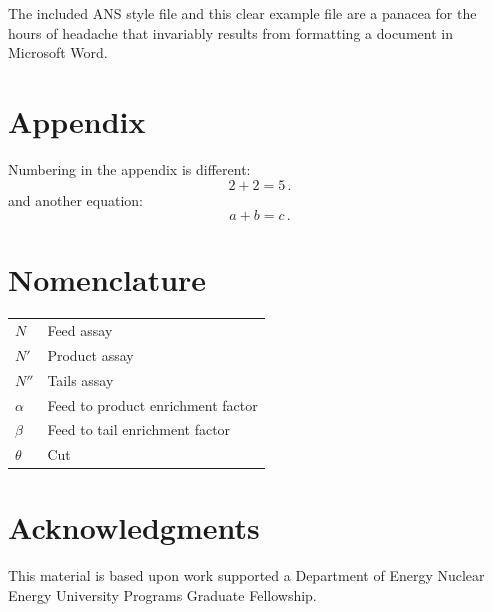 \documentclass{anstrans}
\begin{document}
The included ANS style file and this clear example file are a panacea for
the hours of headache that invariably results from formatting a document in
Microsoft Word.

\appendix
\section{Appendix}

Numbering in the appendix is different:
\begin{equation} \label{eq:appendix}
  2 + 2 = 5\,.
\end{equation}
and another equation:
\begin{equation} \label{eq:appendix2}
  a + b = c\,.
\end{equation}

\section{Nomenclature}

\begin{table}[H]
    \centering
    \begin{tabular}{l|l}
        $N$ & Feed assay \\
        $N'$ & Product assay \\
        $N''$ & Tails assay \\
        $\alpha$ & Feed to product enrichment factor \\
        $\beta$ & Feed to tail enrichment factor \\
        $\theta$ & Cut
    \end{tabular}
    \label{tab:my_label}
\end{table}

\section{Acknowledgments}
This material is based upon work supported a Department of Energy Nuclear
Energy University Programs Graduate Fellowship.



\end{document}
